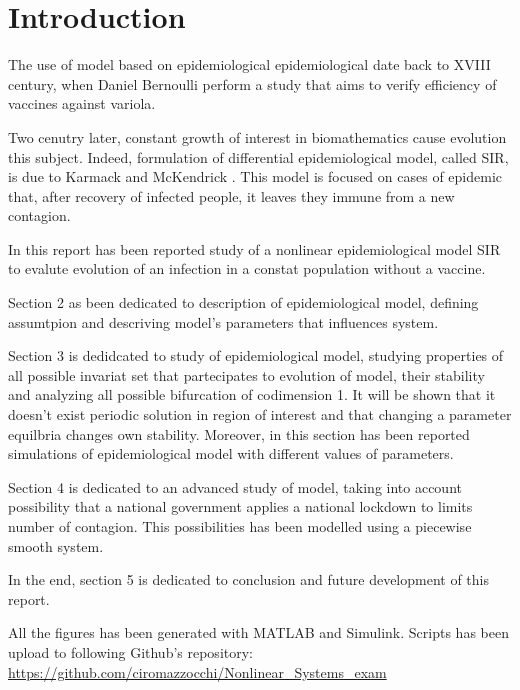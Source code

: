 \section{Introduction}
The use of model based on epidemiological epidemiological date back to XVIII century, when Daniel Bernoulli perform a study that aims to verify efficiency of vaccines against variola.

Two cenutry later, constant growth of interest in biomathematics cause evolution this subject. Indeed, formulation of differential epidemiological model, called SIR, is due to Karmack and McKendrick \cite{bib:kermack_mckendrick}. This model is focused on cases of epidemic that, after recovery of infected people, it leaves they immune from a new contagion.

In this report has been reported study of a nonlinear epidemiological model SIR to evalute evolution of an infection in a constat population without a vaccine.

Section 2 as been dedicated to description of epidemiological model, defining assumtpion and descriving model's parameters that influences system.

Section 3 is dedidcated to study of epidemiological model, studying properties of all possible invariat set that partecipates to evolution of model, their stability and analyzing all possible bifurcation of codimension 1. It will be shown that it doesn't exist periodic solution in region of interest and that changing a parameter equilbria changes own stability.
Moreover, in this section has been reported simulations of epidemiological model with different values of parameters.

Section 4 is dedicated to an advanced study of model, taking into account possibility that a national government applies a national lockdown to limits number of contagion. This possibilities has been modelled using a piecewise smooth system.

In the end, section 5 is dedicated to conclusion and future development of this report.

All the figures has been generated with MATLAB and Simulink. Scripts has been upload to following Github's repository: \url{https://github.com/ciromazzocchi/Nonlinear_Systems_exam}